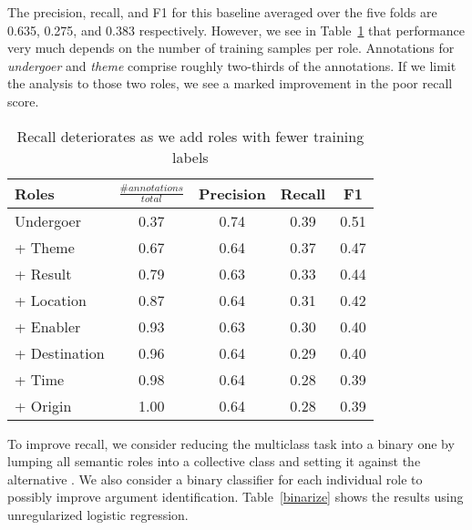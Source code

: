 \documentclass{article} %
\def\func#1{\textrm{\bf{\sc{#1}}}}
\begin{document}
The precision, recall, and F1 for this baseline averaged over the five folds are 0.635, 0.275, and 0.383 respectively.  However, we see in Table~\ref{supervise} that performance very much depends on the number of training samples per role. Annotations for {\it undergoer} and {\it theme} comprise roughly two-thirds of the annotations.  If we limit the analysis to those two roles, we see a marked improvement in the poor recall score.
\begin{table}[ht]
\centering
\renewcommand{\arraystretch}{1.4}
\begin{tabular}{l c c c c} \toprule
Roles & $\frac{\# annotations}{total}$ & Precision & Recall & F1 \\ \midrule
Undergoer & 0.37 & 0.74 & 0.39 & 0.51 \\
+ Theme & 0.67 & 0.64 & 0.37 & 0.47 \\
+ Result & 0.79 & 0.63 & 0.33 & 0.44 \\
+ Location & 0.87 & 0.64 & 0.31 & 0.42 \\
+ Enabler & 0.93 & 0.63 & 0.30 & 0.40 \\
+ Destination & 0.96 & 0.64 & 0.29 & 0.40 \\
+ Time & 0.98 & 0.64 & 0.28 & 0.39 \\
+ Origin & 1.00 & 0.64 & 0.28 & 0.39 \\
\bottomrule
\end{tabular}
\caption{Recall deteriorates as we add roles with fewer training labels}\label{supervise}
\end{table}
 To improve recall, we consider reducing the multiclass task into a binary one by lumping all semantic roles into a collective class \func{semantic} and setting it against the alternative \func{nonsemantic}.  We also consider a binary classifier for each individual role to possibly improve argument identification.  Table~\ref{binarize} shows the results using unregularized logistic regression.  
\end{document}
